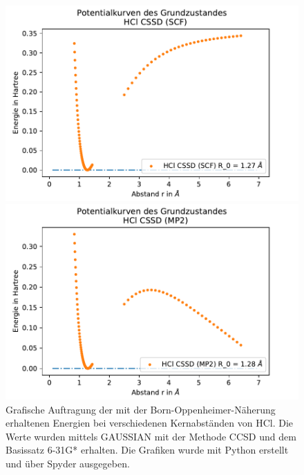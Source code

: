 \begin{figure}[H]
	\center
	\begin{minipage}{0.8\textwidth}
	\includegraphics[width=\textwidth]{Bilder/HCl_CSSD(SCF).pdf}
	
	\end{minipage}
\begin{minipage}{0.8\textwidth}
	\includegraphics[width=\textwidth]{Bilder/HCl_CSSD(MP2).pdf}
	
	\end{minipage}	
	\caption{Grafische Auftragung der mit der Born-Oppenheimer-Näherung erhaltenen Energien bei verschiedenen Kernabständen von HCl. Die Werte wurden mittels GAUSSIAN mit der Methode CCSD und dem Basissatz 6-31G* erhalten. Die Grafiken wurde mit Python erstellt und über Spyder ausgegeben.}	
\end{figure}







